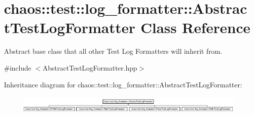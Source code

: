 \hypertarget{classchaos_1_1test_1_1log__formatter_1_1_abstract_test_log_formatter}{\section{chaos\-:\-:test\-:\-:log\-\_\-formatter\-:\-:Abstract\-Test\-Log\-Formatter Class Reference}
\label{classchaos_1_1test_1_1log__formatter_1_1_abstract_test_log_formatter}
}


Abstract base class that all other Test Log Formatters will inherit from.  




{\ttfamily \#include $<$Abstract\-Test\-Log\-Formatter.\-hpp$>$}

Inheritance diagram for chaos\-:\-:test\-:\-:log\-\_\-formatter\-:\-:Abstract\-Test\-Log\-Formatter\-:\begin{figure}[H]
\begin{center}
\leavevmode
\includegraphics[height=0.903226cm]{classchaos_1_1test_1_1log__formatter_1_1_abstract_test_log_formatter}
\end{center}
\end{figure}
